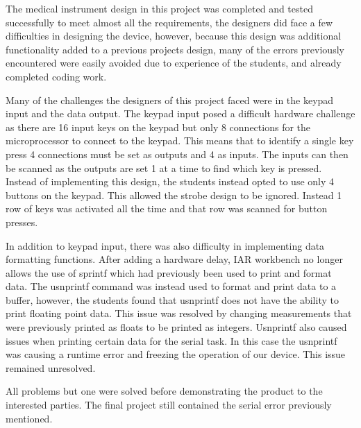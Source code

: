 \documentclass[12pt]{article} %
\begin{document}

  The medical instrument design in this project was completed and tested
    successfully to meet almost all the requirements, the designers did face a few difficulties in designing the device, however, because this design was additional functionality added to a previous projects design, many of the errors previously encountered were easily avoided due to experience of the students, and already completed coding work.
    
    
    Many of the challenges the designers of this project faced were in the keypad input and the data output. The keypad input posed a difficult hardware challenge as there are 16 input keys on the keypad but only 8 connections for the microprocessor to connect to the keypad. This means that to identify a single key press 4 connections must be set as outputs and 4 as inputs. The inputs can then be scanned as the outputs are set 1 at a time to find which key is pressed. Instead of implementing this design, the students instead opted to use only 4 buttons on the keypad. This allowed the strobe design to be ignored. Instead 1 row of keys was activated all the time and that row was scanned for button presses.
    
    In addition to keypad input, there was also difficulty in implementing data formatting functions. After adding a hardware delay, IAR workbench no longer allows the use of sprintf which had previously been used to print and format data. The usnprintf command was instead used to format and print data to a buffer, however, the students found that usnprintf does not have the ability to print floating point data. This issue was resolved by changing measurements that were previously printed as floats to be printed as integers. Usnprintf also caused issues when printing certain data for the serial task. In this case the usnprintf was causing a runtime error and freezing the operation of our device. This issue remained unresolved. 
    
    
    
    
    All problems but one were solved before demonstrating the product to the interested
    parties. The final project still contained the serial error previously mentioned.
    
\end{document}
